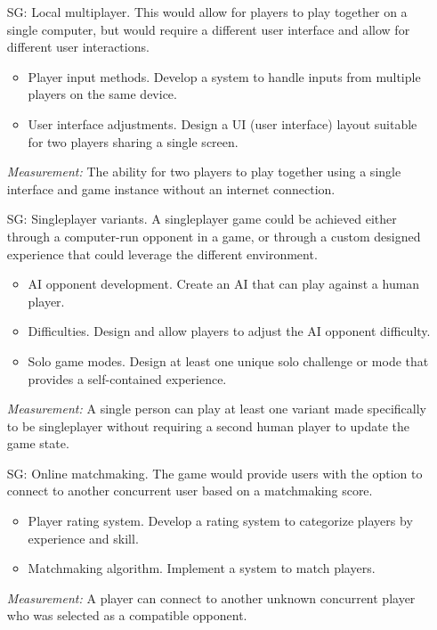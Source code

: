 \begin{itemize}

	\item[SG\refstepcounter{goalnum}\thegoalnum \label{G_local_multiplayer}:] Local multiplayer. This would allow for players to play together on a single computer, but would require a different user interface and allow for different user interactions.
	\begin{itemize}
        \item Player input methods. Develop a system to handle inputs from multiple players on the same device.
        \item User interface adjustments. Design a UI (user interface) layout suitable for two players sharing a single screen.
    \end{itemize}
	\textit{Measurement:} The ability for two players to play together using a single interface and game instance without an internet connection.

	\item[SG\refstepcounter{goalnum}\thegoalnum \label{G_singleplayer}:] Singleplayer variants. A singleplayer game could be achieved either through a computer-run opponent in a game, or through a custom designed experience that could leverage the different environment.
	\begin{itemize}
        \item AI opponent development. Create an AI that can play against a human player.
        \item Difficulties. Design and allow players to adjust the AI opponent difficulty.
        \item Solo game modes. Design at least one unique solo challenge or mode that provides a self-contained experience.
    \end{itemize}
	\textit{Measurement:} A single person can play at least one variant made specifically to be singleplayer without requiring a second human player to update the game state.

	\item[SG\refstepcounter{goalnum}\thegoalnum \label{G_matchmaking}:] Online matchmaking. The game would provide users with the option to connect to another concurrent user based on a matchmaking score.
	\begin{itemize}
        \item Player rating system. Develop a rating system to categorize players by experience and skill.
        \item Matchmaking algorithm. Implement a system to match players.
    \end{itemize}
	\textit{Measurement:} A player can connect to another unknown concurrent player who was selected as a compatible opponent.


\end{itemize}

